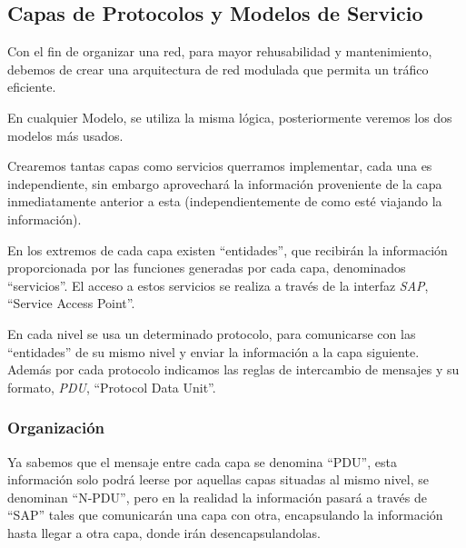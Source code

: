 \subsection{Capas de Protocolos y Modelos de Servicio}
\noindent Con el fin de organizar una red, para mayor rehusabilidad y mantenimiento, debemos de crear una arquitectura de red modulada que permita un tráfico eficiente.
\par \vspace{.5cm}
\noindent En cualquier Modelo, se utiliza la misma lógica, posteriormente veremos los dos modelos más usados. \par \noindent Crearemos tantas capas como servicios querramos implementar, cada una es independiente, sin embargo aprovechará la información proveniente de la capa inmediatamente anterior a esta (independientemente de como esté viajando la información).
\par \noindent En los extremos de cada capa existen ``entidades'', que recibirán la información proporcionada por las funciones generadas por cada capa, denominados ``servicios''. El acceso a estos servicios se realiza a través de la interfaz \textit{SAP}, ``Service Access Point''.
\par \noindent En cada nivel se usa un determinado protocolo, para comunicarse con las ``entidades'' de su mismo nivel y enviar la información a la capa siguiente. Además por cada protocolo indicamos las reglas de intercambio de mensajes y su formato, \textit{PDU}, ``Protocol Data Unit''.
\subsubsection{Organización}
\noindent Ya sabemos que el mensaje entre cada capa se denomina ``PDU'', esta información solo podrá leerse por aquellas capas situadas al mismo nivel, se denominan ``N-PDU'', pero en la realidad la información pasará a través de ``SAP'' tales que comunicarán una capa con otra, encapsulando la información hasta llegar a otra capa, donde irán desencapsulandolas.
